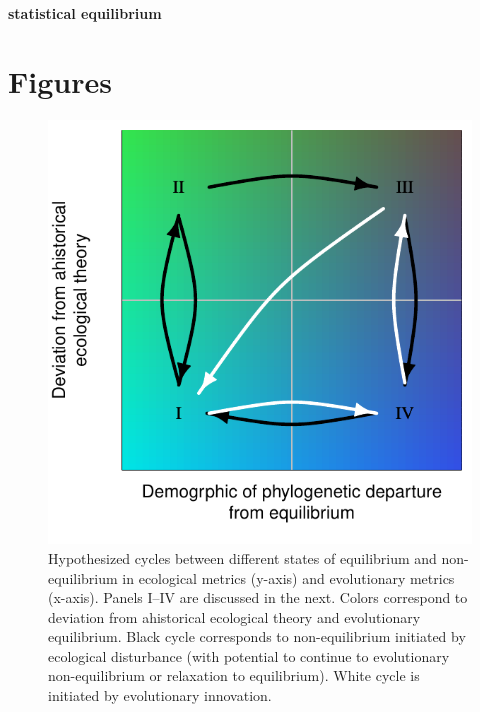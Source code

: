 \documentclass[12pt]{article}
\begin{document}
\paragraph{statistical equilibrium}

\pagebreak

\section*{Figures}

\begin{figure}[!hbp]
  \centering
  \includegraphics[scale=1]{fig_cycles.pdf}
  \caption{Hypothesized cycles between different states of equilibrium
    and non-equilibrium in ecological metrics (y-axis) and
    evolutionary metrics (x-axis). Panels I--IV are discussed in the
    next.  Colors correspond to deviation from ahistorical ecological
    theory and evolutionary equilibrium.  Black cycle corresponds to
    non-equilibrium initiated by ecological disturbance (with
    potential to continue to evolutionary non-equilibrium or
    relaxation to equilibrium). White cycle is initiated by
    evolutionary innovation.}
  \label{fig:cycles}
\end{figure}
\end{document}
